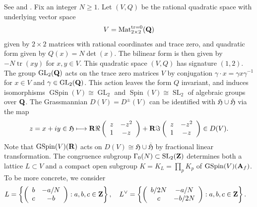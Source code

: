 \documentclass{amsart}
\theoremstyle{definition}
\theoremstyle{definition}
\theoremstyle{definition}
\begin{document}
See \cite[$\S 2.4$]{BO} and \cite[$\S$7.3]{BY}. Fix an integer $N \geq 1$. Let $(V, Q)$ be the rational quadratic space with underlying vector space  
\begin{align*} V = \operatorname{Mat}_{2 \times 2}^{\operatorname{tr}=0}({\bf{Q}}) \end{align*} 
given by $2 \times 2$ matrices with rational coordinates and trace zero, and quadratic form given by 
$Q(x) = N \det(x)$. The bilinear form is then given by $ - N \operatorname{tr}(xy)$ for $x, y \in V$. This quadratic space $(V, Q)$ has signature $(1, 2)$. 
The group $\operatorname{GL}_2({\bf{Q}})$ acts on the trace zero matrices $V$ by conjugation 
$\gamma \cdot x = \gamma x \gamma^{-1}$ for $x \in V$ and $\gamma \in \operatorname{GL}_2({\bf{Q}})$. This action
leaves the form $Q$ invariant, and induces isomorphisms 
$\operatorname{GSpin}(V) \cong \operatorname{GL}_2$ and  $\operatorname{Spin}(V) \cong \operatorname{SL}_2$
of algebraic groups over ${\bf{Q}}$. The Grassmannian $D(V) = D^{\pm}(V)$ can be identified with $\mathfrak{H} \cup \overline{\mathfrak{H}}$ via the map
\begin{align*} z = x + i y \in \mathfrak{H} \longmapsto {\bf{R}} \Re \left( \begin{array}{cc} z & -z^2 \\ 1 & -z \end{array} \right) 
+ {\bf{R}} \Im \left( \begin{array}{cc} z & -z^2 \\ 1 & -z \end{array} \right) \in D(V). \end{align*}
Note that $\operatorname{GSpin}(V)({\bf{R}})$ acts on $D(V) \cong \mathfrak{H} \cup \overline{\mathfrak{H}}$ by fractional linear transformation. 
The congruence subgroup $\Gamma_0(N) \subset \operatorname{SL}_2({\bf{Z}})$ determines both a lattice $L \subset V$ and a 
compact open subgroup $K = K_L = \prod_p K_p$ of $\operatorname{GSpin}(V)({\bf{A}}_f)$. To be more concrete, we consider 
\begin{align}\label{Ln=1} L &= \left\lbrace \left( \begin{array}{cc} b & - a/N \\ c & - b \end{array} \right) : a, b, c \in {\bf{Z}} \right\rbrace,
\quad L^{\vee} = \left\lbrace \left( \begin{array}{cc} b/2N & -a/N \\ c & -b/2N \end{array} \right) : a, b, c \in {\bf{Z}} \right\rbrace. \end{align}
\end{document}
